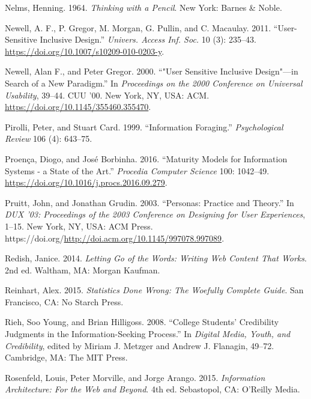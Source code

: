 \begin{CSLReferences}{1}{0}
\leavevmode{}%
Nelms, Henning. 1964. \emph{Thinking with a Pencil}. New York: {Barnes
\& Noble}.

\leavevmode{}%
Newell, A. F., P. Gregor, M. Morgan, G. Pullin, and C. Macaulay. 2011.
{``User-Sensitive Inclusive Design.''} \emph{Univers. Access Inf. Soc.}
10 (3): 235--43. \url{https://doi.org/10.1007/s10209-010-0203-y}.

\leavevmode{}%
Newell, Alan F., and Peter Gregor. 2000. {``"User Sensitive Inclusive
Design"---in Search of a New Paradigm.''} In \emph{Proceedings on the
2000 Conference on Universal Usability}, 39--44. CUU '00. New York, NY,
USA: ACM. \url{https://doi.org/10.1145/355460.355470}.

\leavevmode{}%
Pirolli, Peter, and Stuart Card. 1999. {``Information Foraging.''}
\emph{Psychological Review} 106 (4): 643--75.

\leavevmode{}%
Proença, Diogo, and José Borbinha. 2016. {``Maturity Models for
Information Systems - a State of the Art.''} \emph{Procedia Computer
Science} 100: 1042--49.
\url{https://doi.org/10.1016/j.procs.2016.09.279}.

\leavevmode{}%
Pruitt, John, and Jonathan Grudin. 2003. {``Personas: Practice and
Theory.''} In \emph{DUX '03: Proceedings of the 2003 Conference on
Designing for User Experiences}, 1--15. New York, NY, USA: ACM Press.
https://doi.org/\url{http://doi.acm.org/10.1145/997078.997089}.

\leavevmode{}%
Redish, Janice. 2014. \emph{Letting Go of the Words: Writing Web Content
That Works}. 2nd ed. Waltham, MA: Morgan Kaufman.

\leavevmode{}%
Reinhart, Alex. 2015. \emph{Statistics Done Wrong: The Woefully Complete
Guide}. San Francisco, CA: No Starch Press.

\leavevmode{}%
Rieh, Soo Young, and Brian Hilligoss. 2008. {``College Students'
Credibility Judgments in the Information-Seeking Process.''} In
\emph{Digital Media, Youth, and Credibility}, edited by Miriam J.
Metzger and Andrew J. Flanagin, 49--72. Cambridge, MA: The MIT Press.

\leavevmode{}%
Rosenfeld, Louis, Peter Morville, and Jorge Arango. 2015.
\emph{Information Architecture: For the Web and Beyond}. 4th ed.
Sebastopol, CA: O'Reilly Media.


\end{CSLReferences}
